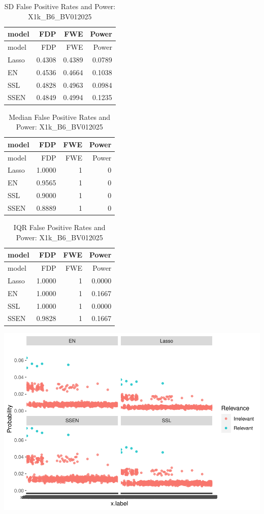 \documentclass[
]{article}
\begin{document}
\begin{longtable}[]{@{}lrrr@{}}
\caption{SD False Positive Rates and Power:
X1k\_B6\_BV012025}\tabularnewline
\toprule
model & FDP & FWE & Power \\
\midrule
\endfirsthead
\toprule
model & FDP & FWE & Power \\
\midrule
\endhead
Lasso & 0.4308 & 0.4389 & 0.0789 \\
EN & 0.4536 & 0.4664 & 0.1038 \\
SSL & 0.4828 & 0.4963 & 0.0984 \\
SSEN & 0.4849 & 0.4994 & 0.1235 \\
\bottomrule
\end{longtable}

\begin{longtable}[]{@{}lrrr@{}}
\caption{Median False Positive Rates and Power:
X1k\_B6\_BV012025}\tabularnewline
\toprule
model & FDP & FWE & Power \\
\midrule
\endfirsthead
\toprule
model & FDP & FWE & Power \\
\midrule
\endhead
Lasso & 1.0000 & 1 & 0 \\
EN & 0.9565 & 1 & 0 \\
SSL & 0.9000 & 1 & 0 \\
SSEN & 0.8889 & 1 & 0 \\
\bottomrule
\end{longtable}

\begin{longtable}[]{@{}lrrr@{}}
\caption{IQR False Positive Rates and Power:
X1k\_B6\_BV012025}\tabularnewline
\toprule
model & FDP & FWE & Power \\
\midrule
\endfirsthead
\toprule
model & FDP & FWE & Power \\
\midrule
\endhead
Lasso & 1.0000 & 1 & 0.0000 \\
EN & 1.0000 & 1 & 0.1667 \\
SSL & 1.0000 & 1 & 0.0000 \\
SSEN & 0.9828 & 1 & 0.1667 \\
\bottomrule
\end{longtable}

\includegraphics{simulation_results_files/figure-latex/unnamed-chunk-13-1.pdf}
\end{document}
